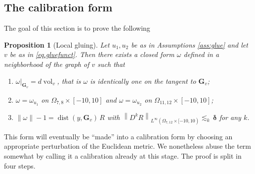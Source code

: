 \documentclass[reqno]{amsart}
\newtheorem{proposition}[theorem]{Proposition}
\theoremstyle{definition}
\theoremstyle{remark}
\numberwithin{equation}{section}
\newcommand{\norm}[1]{\left\lVert#1\right\rVert}
\DeclareMathOperator{\dist}{dist}
\newcommand{\bG}{\mathbf{G}} %
\begin{document}
\subsection{The calibration form}

The goal of this section is to prove the following 

\begin{proposition}[Local gluing]\label{prop:localglue}
    Let $u_1,u_2$ be as in Assumptions \ref{ass:glue} and let $v$ be as in \eqref{eq.gluefunct}. Then there exists a \emph{closed} form $\omega$ defined in a neighborhood of the graph of $v$ such that
    \begin{enumerate}[label=(F.\arabic*)]
    \item\label{prop:localglue-F1} $\omega|_{\bG_v}=d\operatorname{vol}_v$, that is $\omega$ is identically one on the tangent to $\bG_v$;
    \item\label{prop:localglue-F2} $\omega=\omega_{u_1}$ on $\Omega_{7,8}\times [-10,10]$ and $\omega=\omega_{u_2}$ on $\Omega_{11,12}\times [-10,10]$;
    \item\label{prop:localglue-F3} $\|\omega\|-1 = \dist(y,\bG_v)\,R$ with $\norm{D^k R}_{L^\infty(\Omega_{7,12}\times[-10,10)} \lesssim_k \,\boldsymbol{\delta}$ for any $k$.
    \end{enumerate}
\end{proposition}

This form will eventually be ``made'' into a calibration form by choosing an appropriate perturbation of the Euclidean metric. We nonetheless abuse the term somewhat by calling it a calibration already at this stage. The proof is split in four steps.
\end{document}
